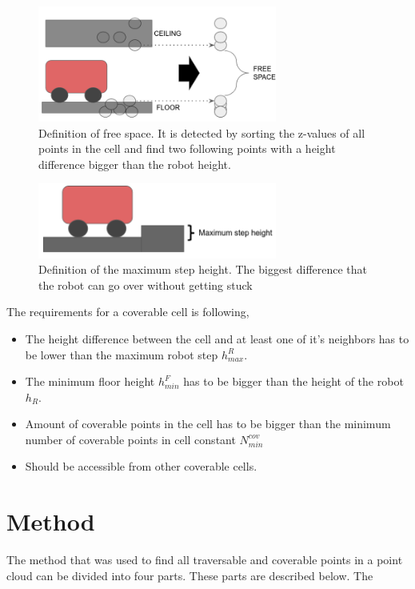 \begin{figure}
    \centering
    \includegraphics[width=0.7\textwidth]{figures/freespace.png}
    \caption{Definition of free space. It is detected by sorting the z-values of all points in the cell and find two following points with a height difference bigger than the robot height.}
    \label{fig:freespace}
\end{figure}

\begin{figure}
    \centering
    \includegraphics[width=0.7\textwidth]{figures/maxstepheight.png}
    \caption{Definition of the maximum step height. The biggest difference that the robot can go over without getting stuck}
    \label{fig:maxstepheight}
\end{figure}
 
The requirements for a coverable cell is following,
 \begin{itemize}
     \item The height difference between the cell and at least one of it's neighbors has to be lower than the maximum robot step $h^{R}_{max}$.
     \item The minimum floor height $h^{F}_{min}$ has to be bigger than the height of the robot $h_R$.
     \item Amount of coverable points in the cell has to be bigger than the minimum number of coverable points in cell constant $N^{cov}_{min}$
     \item Should be accessible from other coverable cells.
 \end{itemize}

\section{Method}
The method that was used to find all traversable and coverable points in a point cloud can be divided into four parts. These parts are described below. The 

